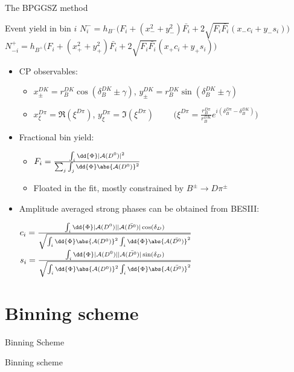 \documentclass{beamer}
\begin{document}
\begin{frame}{The BPGGSZ method}
  \begin{block}{Event yield in bin $i$}
    \scriptsize
    $N^-_i = h_{B^-}\big(F_i + (x_-^2 + y_-^2)\bar{F_i} + 2\sqrt{F_i\bar{F_i}}(x_-c_i + y_-s_i)\big)$ \\
    $N^+_{-i} = h_{B^+}\big(F_i + (x_+^2 + y_+^2)\bar{F_i} + 2\sqrt{F_i\bar{F_i}}(x_+c_i + y_+s_i)\big)$
  \end{block}
  \begin{itemize}
    \item{CP observables:}
    \begin{itemize}
      \item{$x_\pm^{DK} = r_B^{DK}\cos(\delta_B^{DK}\pm\gamma)$, \quad $y_\pm^{DK} = r_B^{DK}\sin(\delta_B^{DK}\pm\gamma)$}
      \item{$x_\xi^{D\pi} = \Re(\xi^{D\pi})$, $y_\xi^{D\pi} = \Im(\xi^{D\pi})$ $\quad\quad\Big(\xi^{D\pi} = \frac{r_B^{D\pi}}{r_B^{DK}}e^{i(\delta_B^{D\pi} - \delta_B^{DK})}\Big)$}
    \end{itemize}
    \item{Fractional bin yield:}
    \begin{itemize}
      \item{$F_i = \frac{\int_i\dd{\Phi}|\mathcal{A}(D^0)|^2}{\sum_j\int_j\dd{\Phi}\abs{\mathcal{A}(D^0)}^2}$}
      \item{Floated in the fit, mostly constrained by $B^\pm\to D\pi^\pm$}
    \end{itemize}
  \end{itemize}
  \begin{itemize}
    \item{Amplitude averaged strong phases can be obtained from BESIII:}
    \begin{center}
      $c_i = \frac{\int_i\dd{\Phi}|\mathcal{A}(D^0)||\mathcal{A}(\bar{D^0})|\cos(\delta_D)}{\sqrt{\int_i\dd{\Phi}\abs{\mathcal{A}(D^0)}^2\int_i\dd{\Phi}\abs{\mathcal{A}(\bar{D^0})}^2}}$ \quad $s_i = \frac{\int_i\dd{\Phi}|\mathcal{A}(D^0)||\mathcal{A}(\bar{D^0})|\sin(\delta_D)}{\sqrt{\int_i\dd{\Phi}\abs{\mathcal{A}(D^0)}^2\int_i\dd{\Phi}\abs{\mathcal{A}(\bar{D^0})}^2}}$
    \end{center}
  \end{itemize}
\end{frame}

\section{Binning scheme}
\begin{frame}{Binning Scheme}
  \begin{center}
    {\huge Binning scheme}
  \end{center}
\end{frame}
\end{document}

